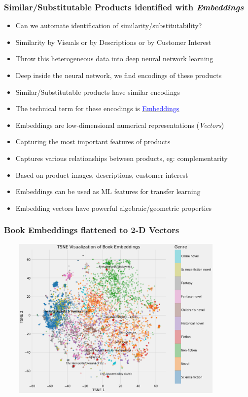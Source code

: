 \documentclass[handout]{beamer}
\begin{document}
\begin{frame}
\frametitle{Similar/Substitutable Products identified with {\em Embeddings}}
\pause
\begin{itemize}[<+->]
\item Can we automate identification of similarity/substitutability?
\item Similarity by Visuals or by Descriptions or by Customer Interest
\item Throw this heterogeneous data into deep neural network learning
\item Deep inside the neural network, we find encodings of these products
\item Similar/Substitutable products have similar encodings
\item The technical term for these encodings is \href{https://developers.google.com/machine-learning/crash-course/embeddings/video-lecture}{\underline{\textcolor{blue}{Embeddings}}}
\item Embeddings are low-dimensional numerical representations ({\em Vectors})
\item Capturing the most important features of products
\item Captures various relationships between products, eg: complementarity
\item Based on product images, descriptions, customer interest
\item Embeddings can be used as ML features for transfer learning
\item Embedding vectors have powerful algebraic/geometric properties
\end{itemize}
\end{frame}

\begin{frame}
\frametitle{Book Embeddings flattened to 2-D Vectors}
\includegraphics[width=12cm, height=8cm]{../supply_chain/BookEmbeddings.png}
\end{frame}
\end{document}
